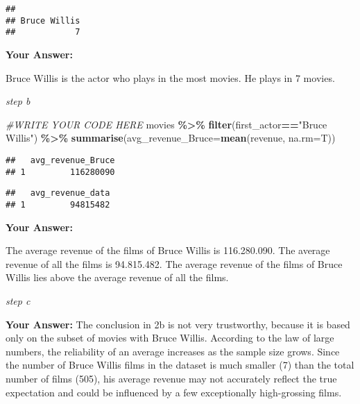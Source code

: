 \documentclass[
]{article}
\newenvironment{Shaded}{\begin{snugshade}}{\end{snugshade}}
\newcommand{\AttributeTok}[1]{\textcolor[rgb]{0.13,0.29,0.53}{#1}}
\newcommand{\CommentTok}[1]{\textcolor[rgb]{0.56,0.35,0.01}{\textit{#1}}}
\newcommand{\FunctionTok}[1]{\textcolor[rgb]{0.13,0.29,0.53}{\textbf{#1}}}
\newcommand{\NormalTok}[1]{#1}
\newcommand{\SpecialCharTok}[1]{\textcolor[rgb]{0.81,0.36,0.00}{\textbf{#1}}}
\newcommand{\StringTok}[1]{\textcolor[rgb]{0.31,0.60,0.02}{#1}}
\begin{document}
\begin{verbatim}
## 
## Bruce Willis 
##            7
\end{verbatim}

\textbf{Your Answer:}

Bruce Willis is the actor who plays in the most movies. He plays in 7
movies.

\emph{step b}

\begin{Shaded}
\begin{Highlighting}[]
\CommentTok{\#WRITE YOUR CODE HERE}
\NormalTok{movies }\SpecialCharTok{\%\textgreater{}\%} 
  \FunctionTok{filter}\NormalTok{(first\_actor}\SpecialCharTok{==}\StringTok{"Bruce Willis"}\NormalTok{) }\SpecialCharTok{\%\textgreater{}\%} 
  \FunctionTok{summarise}\NormalTok{(}\AttributeTok{avg\_revenue\_Bruce=}\FunctionTok{mean}\NormalTok{(revenue, }\AttributeTok{na.rm=}\NormalTok{T))}
\end{Highlighting}
\end{Shaded}

\begin{verbatim}
##   avg_revenue_Bruce
## 1         116280090
\end{verbatim}

\begin{Shaded}
\end{Shaded}

\begin{verbatim}
##   avg_revenue_data
## 1         94815482
\end{verbatim}

\textbf{Your Answer:}

The average revenue of the films of Bruce Willis is 116.280.090. The
average revenue of all the films is 94.815.482. The average revenue of
the films of Bruce Willis lies above the average revenue of all the
films.

\emph{step c}

\textbf{Your Answer:} The conclusion in 2b is not very trustworthy,
because it is based only on the subset of movies with Bruce Willis.
According to the law of large numbers, the reliability of an average
increases as the sample size grows. Since the number of Bruce Willis
films in the dataset is much smaller (7) than the total number of films
(505), his average revenue may not accurately reflect the true
expectation and could be influenced by a few exceptionally high-grossing
films.
\end{document}
